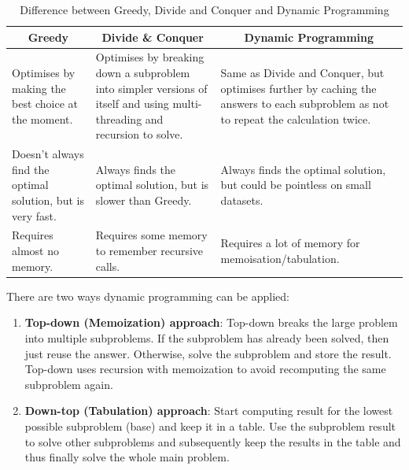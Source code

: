 \documentclass[a4paper,11pt]{book}
\begin{document}
\begin{table}[ht]
\centering
\begin{tabular}{p{3.3cm}|p{3.5cm}|p{4.7cm}}
\hline
\multicolumn{1}{c|}{\textbf{Greedy}}                               & \multicolumn{1}{|c|}{\textbf{Divide \& Conquer}}                                                                                 & \multicolumn{1}{|c}{\textbf{Dynamic Programming}}                                                                                    \\ \hline
Optimises by making the best choice at the moment.    & Optimises by breaking down a subproblem into simpler versions of itself and using multi-threading and recursion to solve. & Same as Divide and Conquer, but optimises further by caching the answers to each subproblem as not to repeat the calculation twice. \\ \hline
Doesn't always find the optimal solution, but is very fast. & Always finds the optimal solution, but is slower than Greedy.                                                            & Always finds the optimal solution, but could be pointless on small datasets.                                                \\ \hline 
Requires almost no memory.                                  & Requires some memory to remember recursive calls.                                                                        & Requires a lot of memory for memoisation/tabulation.                                                                       \\ \hline
\end{tabular}
\caption{Difference between Greedy, Divide and Conquer and Dynamic Programming}
\end{table}

\noindent There are two ways dynamic programming can be applied:

\begin{enumerate}
    \item \textbf{Top-down (Memoization) approach}: Top-down breaks the large problem into multiple subproblems. If the subproblem has already been solved, then just reuse the answer. Otherwise, solve the subproblem and store the result. Top-down uses recursion with memoization to avoid recomputing the same subproblem again.
    \item \textbf{Down-top (Tabulation) approach}: Start computing result for the lowest possible subproblem (base) and keep it in a table. Use the subproblem result to solve other subproblems and subsequently keep the results in the table and thus finally solve the whole main problem.
\end{enumerate}
\end{document}
